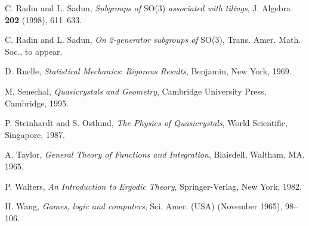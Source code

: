 \documentclass[reqno]{stml-l}
\theoremstyle{plain}
\theoremstyle{definition}
\numberwithin{equation}{chapter}
\begin{document}
\begin{thebibliography}{99}
 C. Radin and L. Sadun, \emph{Subgroups of} SO(3) \emph{associated with tilings}, J. Algebra \textbf{202} (1998), 611--633.

 C. Radin and L. Sadun, \emph{On} \emph{2-generator subgroups of} SO(3), Trans. Amer. Math. Soc., to appear.

 D. Ruelle, \emph{Statistical Mechanics}: \emph{Rigorous Results}, Benjamin, New York, 1969.

 M. Senechal, \emph{Quasicrystals and Geometry}, Cambridge University Press, Cambridge, 1995.

 P. Steinhardt and S. Ostlund, \emph{The Physics of Quasicrystals}, World Scientific, Singapore, 1987.

 A. Taylor, \emph{General Theory of Functions and Integration}, Blaisdell, Waltham, MA, 1965.

 P. Walters, \emph{An Introduction to Ergodic Theory}, Springer-Verlag, New York, 1982.

 H. Wang, \emph{Games, logic and computers}, Sci. Amer. (USA) (November 1965), 98--106.
\end{thebibliography}

\end{document}
